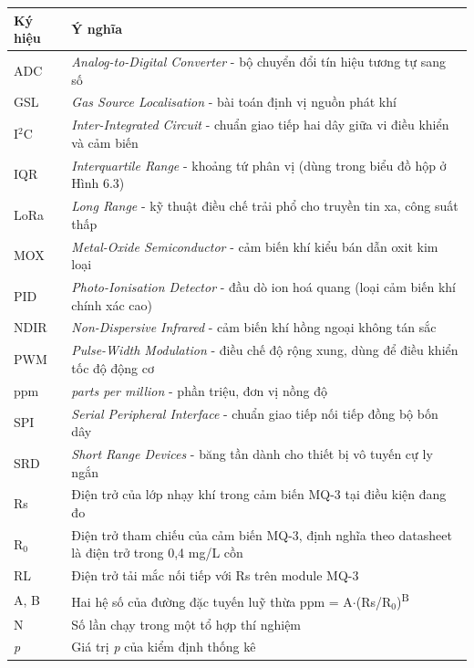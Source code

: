 {\small\renewcommand{\arraystretch}{1.25}
  \small
  \renewcommand{\arraystretch}{1.25}
  \begin{longtable}{>{\raggedright\arraybackslash}p{}>{\raggedright\arraybackslash}p{}}
    \toprule
    \textbf{Ký hiệu} & \textbf{Ý nghĩa} \\
    \midrule
    ADC & \textit{Analog-to-Digital Converter} - bộ chuyển đổi tín hiệu tương tự sang số \\
    GSL & \textit{Gas Source Localisation} - bài toán định vị nguồn phát khí \\
    I$^{2}$C & \textit{Inter-Integrated Circuit} - chuẩn giao tiếp hai dây giữa vi điều khiển và cảm biến \\
    IQR & \textit{Interquartile Range} - khoảng tứ phân vị (dùng trong biểu đồ hộp ở Hình 6.3) \\
    LoRa & \textit{Long Range} - kỹ thuật điều chế trải phổ cho truyền tin xa, công suất thấp \\
    MOX & \textit{Metal-Oxide Semiconductor} - cảm biến khí kiểu bán dẫn oxit kim loại \\
    PID & \textit{Photo-Ionisation Detector} - đầu dò ion hoá quang (loại cảm biến khí chính xác cao) \\
    NDIR & \textit{Non-Dispersive Infrared} - cảm biến khí hồng ngoại không tán sắc \\
    PWM & \textit{Pulse-Width Modulation} - điều chế độ rộng xung, dùng để điều khiển tốc độ động cơ \\
    ppm & \textit{parts per million} - phần triệu, đơn vị nồng độ \\
    SPI & \textit{Serial Peripheral Interface} - chuẩn giao tiếp nối tiếp đồng bộ bốn dây \\
    SRD & \textit{Short Range Devices} - băng tần dành cho thiết bị vô tuyến cự ly ngắn \\
    Rs & Điện trở của lớp nhạy khí trong cảm biến MQ-3 tại điều kiện đang đo \\
    R$_{0}$ & Điện trở tham chiếu của cảm biến MQ-3, định nghĩa theo datasheet là điện trở trong 0,4 mg/L cồn \\
    RL & Điện trở tải mắc nối tiếp với Rs trên module MQ-3 \\
    A, B & Hai hệ số của đường đặc tuyến luỹ thừa ppm = A$\cdot$(Rs/R$_{0}$)\textsuperscript{B} \\
    N & Số lần chạy trong một tổ hợp thí nghiệm \\
    \textit{p} & Giá trị \textit{p} của kiểm định thống kê \\
    \bottomrule
  \end{longtable}
}
